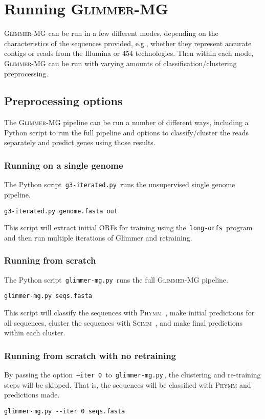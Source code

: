 \documentclass[fleqn,titlepage,11pt]{article}
\def\Gmg{\textsc{Glimmer-MG}}
\def\Phymm{\textsc{Phymm}}
\def\Scimm{\textsc{Scimm}}
\def\Pg#1{\texttt{#1}}
\begin{document}
\section{Running \Gmg{}}
\Gmg{} can be run in a few different modes, depending on the
characteristics of the sequences provided, e.g., whether they
represent accurate contigs or reads from the Illumina or 454
technologies. Then within each mode, \Gmg{} can be run with varying
amounts of classification/clustering preprocessing.

\subsection{Preprocessing options}
The \Gmg{} pipeline can be run a number of different ways, including a
Python script to run the full pipeline and options to classify/cluster
the reads separately and predict genes using those results.

\subsubsection{Running on a single genome}
The Python script \,\Pg{g3-iterated.py}\, runs the unsupervised single
genome pipeline.
\BSV
\begin{verbatim}
g3-iterated.py genome.fasta out
\end{verbatim}
\ESV
This script will extract initial ORFs for training using the \,\Pg{long-orfs}\,
program and then run multiple iterations of Glimmer and retraining.

\subsubsection{Running from scratch}
The Python script \,\Pg{glimmer-mg.py}\, runs the full \Gmg{}
pipeline.
\BSV
\begin{verbatim}
glimmer-mg.py seqs.fasta
\end{verbatim}
\ESV
This script will classify the sequences with \Phymm{}~\cite{phymm},
make initial predictions for all sequences, cluster the sequences with
\Scimm{}~\cite{scimm}, and make final predictions within each cluster.

\subsubsection{Running from scratch with no retraining}
By passing the option \,\Pg{--iter 0}\, to \,\Pg{glimmer-mg.py}\,, the
clustering and re-training steps will be skipped. That is, the
sequences will be classified with \Phymm{} and predictions made.
\BSV
\begin{verbatim}
glimmer-mg.py --iter 0 seqs.fasta
\end{verbatim}
\ESV
\end{document}
